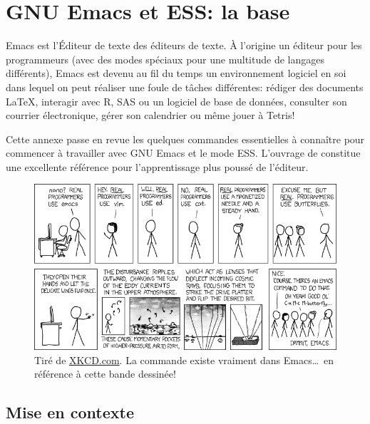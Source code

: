\chapter{GNU Emacs et ESS: la base}
\label{chap:emacs+ess}

Emacs est l'Éditeur de texte des éditeurs de texte. À l'origine un
éditeur pour les programmeurs (avec des modes spéciaux pour une
multitude de langages différents), Emacs est devenu au fil du temps un
environnement logiciel en soi dans lequel on peut réaliser une foule
de tâches différentes: rédiger des documents {\LaTeX}, interagir avec R,
SAS ou un logiciel de base de données, consulter son courrier
électronique, gérer son calendrier ou même jouer à Tetris!

Cette annexe passe en revue les quelques commandes essentielles à
connaître pour commencer à travailler avec GNU Emacs et le mode ESS.
L'ouvrage de \cite{Cameron:Emacs:2004} constitue une excellente
référence pour l'apprentissage plus poussé de l'éditeur.

\begin{figure}[t]
  \centering
  \includegraphics{emacs.png} \\
  \footnotesize\sffamily\flushleft\vspace{-\baselineskip}%
  Tiré de \href{http://xkcd.com/378/}{XKCD.com}. La commande  existe vraiment dans Emacs\dots\ en référence à cette
  bande dessinée!
\end{figure}

\section{Mise en contexte}
\label{sec:emacs+ess:contexte}

